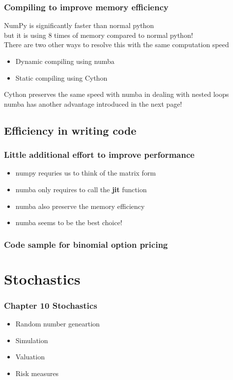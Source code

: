 \documentclass{beamer}
\begin{document}
\begin{frame}
\frametitle{Compiling to improve memory efficiency}
NumPy is significantly faster than normal python\\
but it is using 8 times of memory compared to normal python!\\
There are two other ways to resolve this with the same computation speed
\begin{itemize}
	\item Dynamic compiling using numba
	\item Static compiling using Cython
\end{itemize}
Cython preserves the same speed with numba in dealing with nested loops\\
numba has another advantage introduced in the next page!
\end{frame}

\subsection{Efficiency in writing code}

\begin{frame}
\frametitle{Little additional effort to improve performance}
\begin{itemize}
	\item numpy requries us to think of the matrix form
	\item numba only requires to call the \textbf{jit} function
	\item numba also preserve the memory efficiency
	\item numba seems to be the best choice!
\end{itemize}
\end{frame}

\begin{frame}
\frametitle{Code sample for binomial option pricing}
\end{frame}

\section{Stochastics}
\begin{frame}
\frametitle{Chapter 10 Stochastics}
\begin{itemize}
	\item Random number geneartion
	\item Simulation
	\item Valuation
	\item Risk measures
\end{itemize}
\end{frame}
\end{document}
